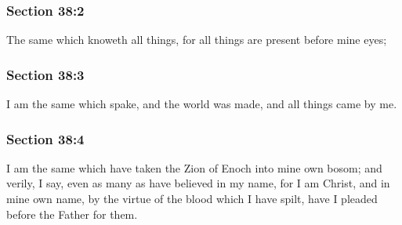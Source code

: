 
	\subsubsection{Section 38:2} %
		\label{DC38-2}

		The same which knoweth all things, for all things are present before mine eyes;


	\subsubsection{Section 38:3} %
		\label{DC38-3}

		I am the same which spake, and the world was made, and all things came by me.


	\subsubsection{Section 38:4} %
		\label{DC38-4}

		I am the same which have taken the Zion of Enoch into mine own bosom; and verily, I say, even as many as have believed in my name, for I am Christ, and in mine own name, by the virtue of the blood which I have spilt, have I pleaded before the Father for them.

